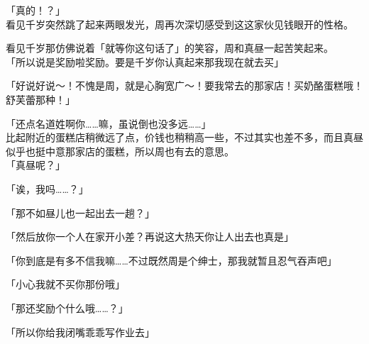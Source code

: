 「真的！？」\\

看见千岁突然跳了起来两眼发光，周再次深切感受到这这家伙见钱眼开的性格。

看见千岁那仿佛说着「就等你这句话了」的笑容，周和真昼一起苦笑起来。\\

「所以说是奖励啦奖励。要是千岁你认真起来那我现在就去买」

「好说好说～！不愧是周，就是心胸宽广～！要我常去的那家店！买奶酪蛋糕哦！舒芙蕾那种！」

「还点名道姓啊你……嘛，虽说倒也没多远……」\\

比起附近的蛋糕店稍微远了点，价钱也稍稍高一些，不过其实也差不多，而且真昼似乎也挺中意那家店的蛋糕，所以周也有去的意思。\\

「真昼呢？」

「诶，我吗……？」

「那不如昼儿也一起出去一趟？」

「然后放你一个人在家开小差？再说这大热天你让人出去也真是」

「你到底是有多不信我嘛……不过既然周是个绅士，那我就暂且忍气吞声吧」

「小心我就不买你那份哦」

「那还奖励个什么哦……？」

「所以你给我闭嘴乖乖写作业去」\\

